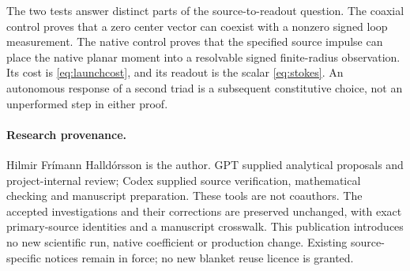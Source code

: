 The two tests answer distinct parts of the source-to-readout question. The coaxial control proves that a zero center vector can coexist with a nonzero signed loop measurement. The native control proves that the specified source impulse can place the native planar moment into a resolvable signed finite-radius observation. Its cost is \eqref{eq:launchcost}, and its readout is the scalar \eqref{eq:stokes}. An autonomous response of a second triad is a subsequent constitutive choice, not an unperformed step in either proof.

\paragraph{Research provenance.}
Hilmir Frímann Halldórsson is the author. GPT supplied analytical proposals and project-internal review; Codex supplied source verification, mathematical checking and manuscript preparation. These tools are not coauthors. The accepted investigations and their corrections are preserved unchanged, with exact primary-source identities and a manuscript crosswalk. This publication introduces no new scientific run, native coefficient or production change. Existing source-specific notices remain in force; no new blanket reuse licence is granted.
